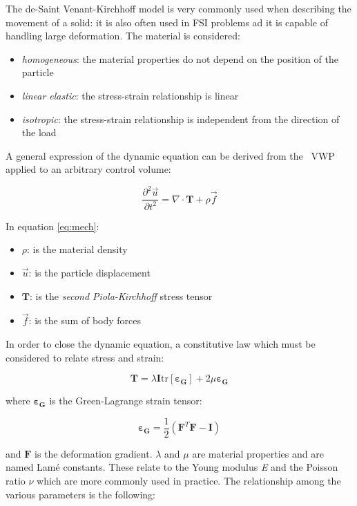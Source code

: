 The  de-Saint Venant-Kirchhoff model \cite{ogden1997non} is very commonly used when describing the movement of a solid: it is also often used in FSI problems ad it is capable of handling large deformation. The material is considered:

\begin{itemize}
	\item \textit{homogeneous}: the material properties do not depend on the position of the particle
	\item \textit{linear elastic}: the stress-strain relationship is linear
	\item \textit{isotropic}: the stress-strain relationship is independent from the direction of the load
\end{itemize}

A general expression of the dynamic equation can be derived from the ~\ac{VWP} applied to an arbitrary control volume: 

\begin{equation}
	\label{eq:mech}
	\frac{\partial^2 \vec{u} }{\partial t^2} = \nabla \cdot \mathbf{T} + \rho \vec{f}
\end{equation}

In equation \ref{eq:mech}:

\begin{itemize}
	\item $\rho$: is the material density
	\item $\vec{u}$: is the particle displacement
	\item $\mathbf{T}$: is the \textit{second Piola-Kirchhoff} stress tensor
	\item $\vec{f}$: is the sum of body forces
\end{itemize}


In order to close the dynamic equation, a constitutive law which must be considered to relate stress and strain:

\begin{equation}
	\mathbf{T} = \lambda \mathbf{I} \mathrm{tr}\left[ \bm{\varepsilon_G}  \right]  + 2\mu \bm{\varepsilon_G}
\end{equation}

where $\bm{\varepsilon_G}$ is the Green-Lagrange strain tensor:

\begin{equation}
	\bm{\varepsilon_G} = \frac{1}{2}\left( \mathbf{F}^T \mathbf{F}-\mathbf{I}  \right)
\end{equation}

and $\mathbf{F}$ is the deformation gradient. $\lambda$ and $\mu$ are material properties and are named Lamé constants. These relate to the Young modulus \textit{E} and the Poisson ratio $\nu$ which are more commonly used in practice. The relationship among the various parameters is the following:


